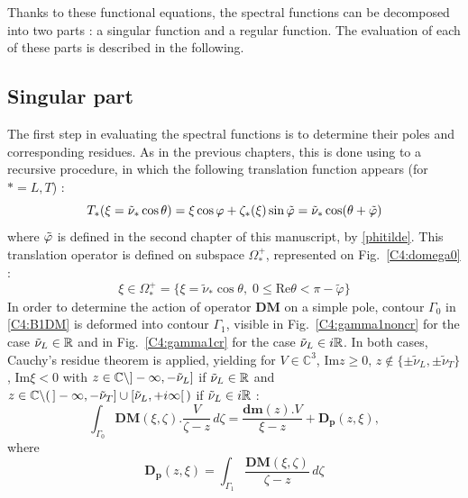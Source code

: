 Thanks to these functional equations, the spectral functions can be decomposed into two parts : a singular function and a regular function. The evaluation of each of these parts is described in the following.

\subsection{Singular part}
\label{C4:singpart}
The first step in evaluating the spectral functions is to determine their poles and corresponding residues. As in the previous chapters, this is done using to a recursive procedure, in which the following translation function appears (for $*=L,T$) :
\begin{equation}
T_*(\xi=\tilde{\nu}_*\cos\theta)=\xi \cos \varphi+\zeta_*(\xi)\sin \tilde{\varphi}=\tilde{\nu}_*\cos(\theta+\tilde{\varphi})
\end{equation}
where $\tilde{\varphi}$ is defined in the second chapter of this manuscript, by \eqref{phitilde}. This translation operator is defined on subspace $\Omega_*^+$, represented on Fig.~\ref{C4:domega0} :
\begin{equation}
\xi \in \Omega_*^+= \{ \xi=\tilde{\nu}_* \cos \theta, \; 0 \leq \mbox{Re} \theta < \pi-\tilde{\varphi} \}
\label{C4:defOmega0}
\end{equation}
In order to determine the action of operator $\mathbf{DM}$ on a simple pole, contour $\Gamma_0$ in \eqref{C4:B1DM} is deformed into contour $\Gamma_1$, visible in Fig.~\ref{C4:gamma1noncr} for the case $\tilde{\nu}_L \in \mathbb{R}$ and in Fig.~\ref{C4:gamma1cr} for the case $\tilde{\nu}_L \in i\mathbb{R}$. In both cases, Cauchy's residue theorem is applied, yielding for $V \in \mathbb{C}^3$, Im$z\geq 0, \, z \notin \{\pm\tilde{\nu}_L,\pm\tilde{\nu}_T \}$, Im$\xi <0 $ with $z\in \mathbb{C} \backslash  \rbrack - \infty, -\tilde{\nu}_L \rbrack$ if $\tilde{\nu}_L \in \mathbb{R}$ and $ z\in \mathbb{C} \backslash ( \, \rbrack - \infty, -\tilde{\nu}_T \rbrack \cup \lbrack \tilde{\nu}_L,+i\infty \lbrack \,)$ if $\tilde{\nu}_L \in i\mathbb{R}$ :
\begin{equation}
\int_{\Gamma_0} \textbf{DM}(\xi,\zeta).\frac{V}{\zeta-z}\,d\zeta = \frac{\textbf{dm}(z).V}{\xi-z}+\mathbf{D_p}(z,\xi),
\label{C4:GaussDM}
\end{equation}
where
\begin{equation}
\mathbf{D_p}(z,\xi)= \int_{\Gamma_1} \frac{\textbf{DM}(\xi,\zeta)}{\zeta-z}\,d\zeta
\label{C4:defDp}
\end{equation}

